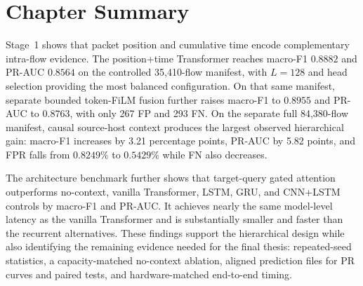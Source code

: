 \documentclass[11pt,fleqn]{report}
\begin{document}

\section{Chapter Summary}
\label{subsec:results_summary}

Stage~1 shows that packet position and cumulative time encode complementary
intra-flow evidence. The position+time Transformer reaches macro-F1 $0.8882$
and PR-AUC $0.8564$ on the controlled 35,410-flow manifest, with $L=128$ and
head selection providing the most balanced configuration. On that same
manifest, separate bounded token-FiLM fusion further raises macro-F1 to
$0.8955$ and PR-AUC to $0.8763$, with only 267 FP and 293 FN. On the separate
full 84,380-flow manifest, causal source-host context produces the largest
observed hierarchical gain: macro-F1 increases by 3.21 percentage points,
PR-AUC by 5.82 points, and FPR falls from $0.8249\%$ to $0.5429\%$ while FN
also decreases.

The architecture benchmark further shows that target-query gated attention
outperforms no-context, vanilla Transformer, LSTM, GRU, and CNN+LSTM controls
by macro-F1 and PR-AUC. It achieves nearly the same model-level latency as the
vanilla Transformer and is substantially smaller and faster than the recurrent
alternatives. These findings support the hierarchical design while also
identifying the remaining evidence needed for the final thesis: repeated-seed
statistics, a capacity-matched no-context ablation, aligned prediction files
for PR curves and paired tests, and hardware-matched end-to-end timing.

%
\end{document}
